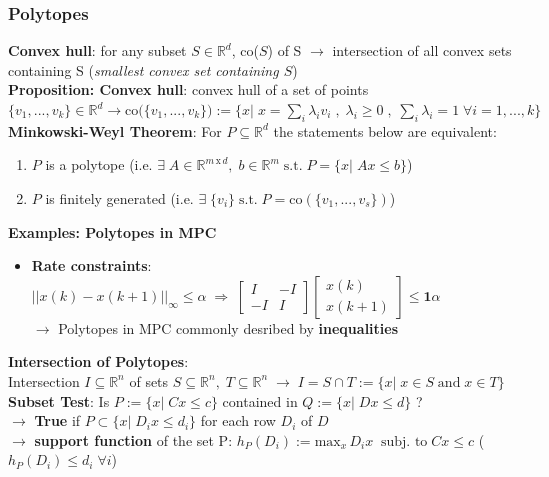 \subsubsection{Polytopes}
  \textbf{Convex hull}: for any subset $S\in\mathbb{R}^d$, co($S$) of S $\rightarrow$ intersection of all convex sets containing S (\textit{smallest convex set containing $S$})\\
  \textbf{Proposition: Convex hull}: convex hull of a set of points $\{v_1,...,v_k\}\in\mathbb{R}^d\rightarrow \text{co($\{v_1,...,v_k\}$}):=\{x|\;x=\sum_i\lambda_iv_i\;,\;\lambda_i\geq0\;,\;\sum_i\lambda_i=1\;\forall i=1,...,k\}$\\
  \textbf{Minkowski-Weyl Theorem}: For $P\subseteq\mathbb{R}^d$ the statements below are equivalent:\\
  \begin{enumerate}
      \item $P$ is a polytope (i.e. $\exists\; A\in\mathbb{R}^{m\,\text{x}\,d},\;b\in\mathbb{R}^m \;\text{s.t.}\;P=\{x|\;Ax\leq b\}$)
      \item $P$ is finitely generated (i.e. $\exists\;\{v_i\}\;\text{s.t.}\; P=\text{co}(\{v_1,...,v_s\})$)
  \end{enumerate}
  \textbf{Examples: Polytopes in MPC}\\
  \begin{itemize}
  \item\textbf{Rate constraints}:\\$||x(k)-x(k+1)||_\infty\leq \alpha\;\Rightarrow\;\begin{bmatrix}I & -I \\ -I & I\end{bmatrix}\begin{bmatrix}x(k) \\ x(k+1)\end{bmatrix}\leq \boldsymbol{1}\alpha$\\
  $\rightarrow$ Polytopes in MPC commonly desribed by \textbf{inequalities}
  \end{itemize}
\textbf{Intersection of Polytopes}: \\Intersection $I\subseteq\mathbb{R}^n$ of sets $S\subseteq\mathbb{R}^n, \;T\subseteq\mathbb{R}^n\;\rightarrow\;I=S\cap T:=\{x|\;x\in S \;\text{and}\; x\in T\}$\\
\textbf{Subset Test}: Is $P:=\{x|\;Cx\leq c\}$ contained in $Q:=\{x|\;Dx\leq d\}$ ?\\ $\rightarrow$ \textbf{True} if $P\subset\{x|\;D_ix\leq d_i\}$ for each row $D_i$ of $D$\\
$\rightarrow$ \textbf{support function} of the set P: $h_P(D_i):=\text{max}_x\,D_ix\;\;\text{subj. to}\;Cx\leq c$ ($h_P(D_i)\leq d_i\;\forall i$)\\

